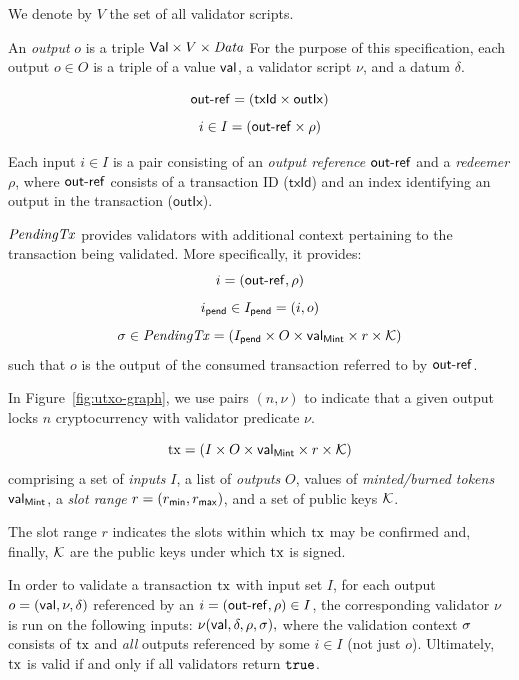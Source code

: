 We denote by $V$ the set of all validator scripts.

\begin{definition}[Outputs]
An \emph{output} $o$ is a triple $\mathsf{Val} \times V \times \mathit{Data}$ 
For the purpose of this specification, each output \(o \in O\) is a triple of a value
$\mathsf{val}$, a validator script $\nu$, and a datum $\delta$.
\end{definition}


\begin{definition}[Inputs]
$$\mathsf{out\textsf{-}{}ref} = (\mathsf{txId} \times \mathsf{outIx})$$
$$i \in I = (\mathsf{out\textsf{-}{}ref} \times \rho)$$

Each input \(i\in I\) is a pair consisting of an \emph{output reference} $\mathsf{out\textsf{-}{}ref}$ and a \emph{redeemer} $\rho$, where $\mathsf{out\textsf{-}{}ref}$ consists of a transaction ID ($\mathsf{txId}$) and an index identifying an output in the transaction ($\mathsf{outIx}$).
\end{definition}

\begin{definition}

$\mathit{PendingTx}$ provides validators with additional context pertaining to the transaction being validated. More specifically, it provides:
\[
  i = (\mathsf{out\textsf{-}{}ref}, \rho)
\]
\[
 i_{\mathsf{pend}} \in I_{\mathsf{pend}} = (i, o)
\]
\[
 \sigma \in \mathit{PendingTx} = (I_{\mathsf{pend}} \times O \times \mathsf{val}_\mathsf{Mint} \times r \times \mathcal K) 
\]
such that $o$ is the output of the
consumed transaction referred to by $\mathsf{out\textsf{-}{}ref}$.

In Figure~\ref{fig:utxo-graph}, we use pairs \((n, \nu)\) to indicate that a given output locks $n$ cryptocurrency with validator predicate $\nu$.
\end{definition}


\begin{definition}[Transactions]
$$
\mathrm{tx} = (I \times O \times \mathsf{val}_\mathsf{Mint} \times r \times \mathcal K)
$$ 
comprising a set of
\emph{inputs} $I$, a list of \emph{outputs} $O$, values of
\emph{minted/burned tokens} $\mathsf{val}_\mathsf{Mint}$, a \emph{slot range}
\(r = (r_{\mathsf{min}}, r_{\mathsf{max}})\), and a set of public keys $\mathcal K$.

The slot range $r$ indicates the slots within which $\mathrm{tx}$ may be
confirmed and, finally, $\mathcal K$ are the public keys under which
$\mathrm{tx}$ is signed.

In order to validate a transaction $\mathrm{tx}$ with input set $I$, for each
output $o = (\mathsf{val},\nu,\delta)$ referenced by an
$i = (\mathsf{out\textsf{-}{}ref},\rho) \in I$, the corresponding validator $\nu$ is run
on the following inputs:
\(
  \nu(\mathsf{val},\delta,\rho,\sigma),
\)
where the validation context $\sigma$ consists of $\mathrm{tx}$ and \emph{all} outputs
referenced by some $i \in I$ (not just $o$). Ultimately, $\mathrm{tx}$ is
valid if and only if all validators return $\mathtt{true}$.
\end{definition}

